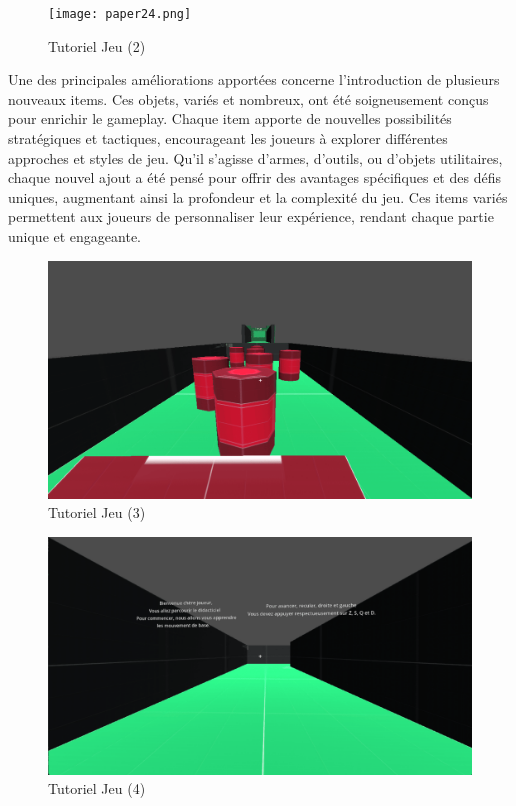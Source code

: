 \documentclass[
	article,			%
	11pt,				%
	oneside,			%
	a4paper,			%
	chapter=TITLE,
	french,			%
	sumario=tradicional
	]{base_nt}
\begin{document}
\begin{figure}[ht]
	\caption{Tutoriel Jeu (2)}
	\centering
	\texttt{[image: paper24.png]}
	\legend{}
	
\end{figure}

\newpage

Une des principales améliorations apportées concerne l'introduction de plusieurs nouveaux items. Ces objets, variés et nombreux, ont été soigneusement conçus pour enrichir le gameplay. Chaque item apporte de nouvelles possibilités stratégiques et tactiques, encourageant les joueurs à explorer différentes approches et styles de jeu. Qu'il s'agisse d'armes, d'outils, ou d'objets utilitaires, chaque nouvel ajout a été pensé pour offrir des avantages spécifiques et des défis uniques, augmentant ainsi la profondeur et la complexité du jeu. Ces items variés permettent aux joueurs de personnaliser leur expérience, rendant chaque partie unique et engageante.

\begin{figure}[ht]
	\caption{Tutoriel Jeu (3)}
	\centering
	\includegraphics[width=1\linewidth]{paper25.png}
	\legend{}
	
\end{figure}

\newpage

\begin{figure}[ht]
	\caption{Tutoriel Jeu (4)}
	\centering
	\includegraphics[width=1\linewidth]{paper26.png}
	\legend{}
	
\end{figure}
\end{document}
